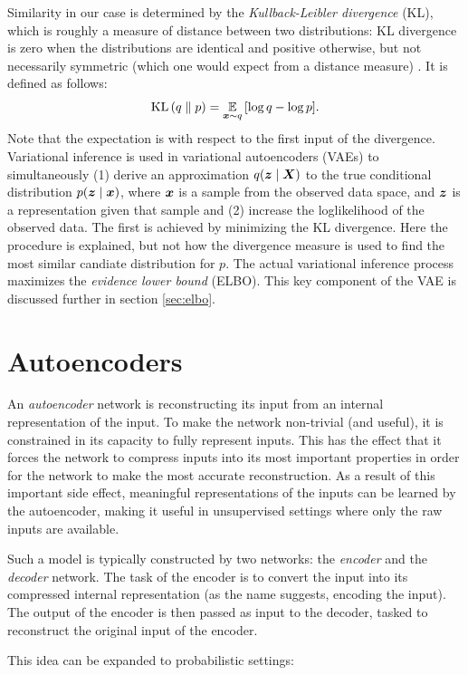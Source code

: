 Similarity in our case is determined by the \textit{Kullback-Leibler divergence} (KL), which is roughly a measure of distance between two distributions: KL divergence is zero when the distributions are identical and positive otherwise, but not necessarily symmetric (which one would expect from a distance measure) \cite{standfordVAE}. It is defined as follows:
\[ \operatorname{KL}{\mathopen{} \left(q \parallel p\right) \mathclose{}} =  \operatorname*{\mathbb{E}}_{\bm{ x }\sim q}{\mathopen{} \left[ \log q - \log p \right] \mathclose{}}.\]
Note that the expectation is with respect to the first input of the divergence. Variational inference is used in variational autoencoders (VAEs) to simultaneously (1) derive an approximation $q{\mathopen{} \left( \bm{ z } \mid \bm{ X } \right) \mathclose{}}$ to the true conditional distribution $p{\mathopen{} \left( \bm{ z } \mid \bm{ x } \right) \mathclose{}}$, where $\bm{ x }$ is a sample from the observed data space, and $\bm{ z }$ is a representation given that sample and (2) increase the loglikelihood of the observed data. The first is achieved by minimizing the KL divergence. Here the procedure is explained, but not how the divergence measure is used to find the most similar candiate distribution for $p$. The actual variational inference process maximizes the \textit{evidence lower bound} (ELBO). This key component of the VAE is discussed further in section \ref{sec:elbo}.

\section{Autoencoders}
\label{seq:autoencoders}
An \textit{autoencoder} network is reconstructing its input from an internal representation of the input. To make the network non-trivial (and useful), it is constrained in its capacity to fully represent inputs. This has the effect that it forces the network to compress inputs into its most important properties in order for the network to make the most accurate reconstruction. As a result of this important side effect, meaningful representations of the inputs can be learned by the autoencoder, making it useful in unsupervised settings where only the raw inputs are available.

Such a model is typically constructed by two networks: the \textit{encoder} and the \textit{decoder} network. The task of the encoder is to convert the input into its compressed internal representation (as the name suggests, encoding the input). The output of the encoder is then passed as input to the decoder, tasked to reconstruct the original input of the encoder.

This idea can be expanded to probabilistic settings: 

